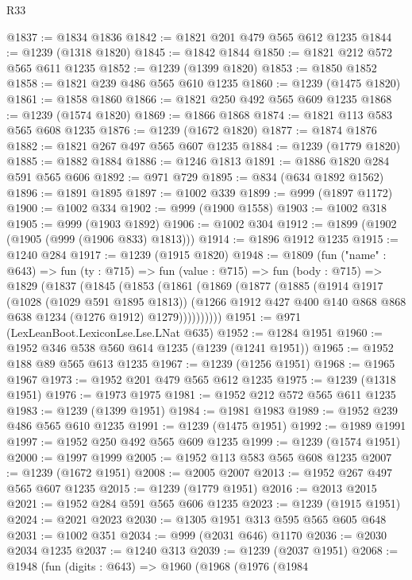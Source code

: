 \begin{lexlean}{R33}
\begin{coremodule}
@1837 := @1834 @1836
@1842 := @1821 @201 @479 @565 @612 @1235
@1844 := @1239 (@1318 @1820)
@1845 := @1842 @1844
@1850 := @1821 @212 @572 @565 @611 @1235
@1852 := @1239 (@1399 @1820)
@1853 := @1850 @1852
@1858 := @1821 @239 @486 @565 @610 @1235
@1860 := @1239 (@1475 @1820)
@1861 := @1858 @1860
@1866 := @1821 @250 @492 @565 @609 @1235
@1868 := @1239 (@1574 @1820)
@1869 := @1866 @1868
@1874 := @1821 @113 @583 @565 @608 @1235
@1876 := @1239 (@1672 @1820)
@1877 := @1874 @1876
@1882 := @1821 @267 @497 @565 @607 @1235
@1884 := @1239 (@1779 @1820)
@1885 := @1882 @1884
@1886 := @1246 @1813
@1891 := @1886 @1820 @284 @591 @565 @606
@1892 := @971 @729
@1895 := @834 (@634 @1892 @1562)
@1896 := @1891 @1895
@1897 := @1002 @339
@1899 := @999 (@1897 @1172)
@1900 := @1002 @334
@1902 := @999 (@1900 @1558)
@1903 := @1002 @318
@1905 := @999 (@1903 @1892)
@1906 := @1002 @304
@1912 := @1899 (@1902 (@1905 (@999 (@1906 @833) @1813)))
@1914 := @1896 @1912 @1235
@1915 := @1240 @284
@1917 := @1239 (@1915 @1820)
@1948 := @1809
    (fun ("name" : @643) =>
    fun (ty : @715) =>
    fun (value : @715) =>
    fun (body : @715) =>
    @1829
      (@1837
        (@1845
          (@1853
            (@1861
              (@1869
                (@1877
                  (@1885
                    (@1914
                      @1917
                      (@1028 (@1029 @591 @1895 @1813))
                      (@1266 @1912 @427 @400 @140 @868 @868 @638 @1234 (@1276 @1912) @1279))))))))))
@1951 := @971 (LexLeanBoot.LexiconLse.Lse.LNat @635)
@1952 := @1284 @1951
@1960 := @1952 @346 @538 @560 @614 @1235 (@1239 (@1241 @1951))
@1965 := @1952 @188 @89 @565 @613 @1235
@1967 := @1239 (@1256 @1951)
@1968 := @1965 @1967
@1973 := @1952 @201 @479 @565 @612 @1235
@1975 := @1239 (@1318 @1951)
@1976 := @1973 @1975
@1981 := @1952 @212 @572 @565 @611 @1235
@1983 := @1239 (@1399 @1951)
@1984 := @1981 @1983
@1989 := @1952 @239 @486 @565 @610 @1235
@1991 := @1239 (@1475 @1951)
@1992 := @1989 @1991
@1997 := @1952 @250 @492 @565 @609 @1235
@1999 := @1239 (@1574 @1951)
@2000 := @1997 @1999
@2005 := @1952 @113 @583 @565 @608 @1235
@2007 := @1239 (@1672 @1951)
@2008 := @2005 @2007
@2013 := @1952 @267 @497 @565 @607 @1235
@2015 := @1239 (@1779 @1951)
@2016 := @2013 @2015
@2021 := @1952 @284 @591 @565 @606 @1235
@2023 := @1239 (@1915 @1951)
@2024 := @2021 @2023
@2030 := @1305 @1951 @313 @595 @565 @605 @648
@2031 := @1002 @351
@2034 := @999 (@2031 @646) @1170
@2036 := @2030 @2034 @1235
@2037 := @1240 @313
@2039 := @1239 (@2037 @1951)
@2068 := @1948
    (fun (digits : @643) =>
    @1960
      (@1968
        (@1976
          (@1984

\end{coremodule}
\end{lexlean}
